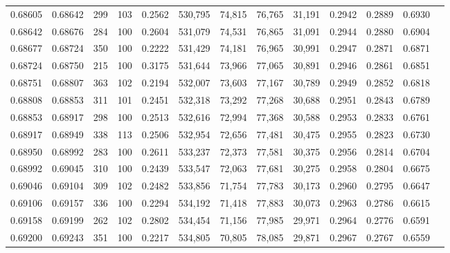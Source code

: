 \begin{tabular}{rrrrrrrrrrrrr}
0.68605 & 0.68642 &   299 & 103 &                                     0.2562 & 530,795 &  74,815 &  76,765 &  31,191 & 0.2942 & 0.2889 & 0.6930 \\
0.68642 & 0.68676 &   284 & 100 &                                     0.2604 & 531,079 &  74,531 &  76,865 &  31,091 & 0.2944 & 0.2880 & 0.6904 \\
0.68677 & 0.68724 &   350 & 100 &                                     0.2222 & 531,429 &  74,181 &  76,965 &  30,991 & 0.2947 & 0.2871 & 0.6871 \\
0.68724 & 0.68750 &   215 & 100 &                                     0.3175 & 531,644 &  73,966 &  77,065 &  30,891 & 0.2946 & 0.2861 & 0.6851 \\
0.68751 & 0.68807 &   363 & 102 &                                     0.2194 & 532,007 &  73,603 &  77,167 &  30,789 & 0.2949 & 0.2852 & 0.6818 \\
0.68808 & 0.68853 &   311 & 101 &                                     0.2451 & 532,318 &  73,292 &  77,268 &  30,688 & 0.2951 & 0.2843 & 0.6789 \\
0.68853 & 0.68917 &   298 & 100 &                                     0.2513 & 532,616 &  72,994 &  77,368 &  30,588 & 0.2953 & 0.2833 & 0.6761 \\
0.68917 & 0.68949 &   338 & 113 &                                     0.2506 & 532,954 &  72,656 &  77,481 &  30,475 & 0.2955 & 0.2823 & 0.6730 \\
0.68950 & 0.68992 &   283 & 100 &                                     0.2611 & 533,237 &  72,373 &  77,581 &  30,375 & 0.2956 & 0.2814 & 0.6704 \\
0.68992 & 0.69045 &   310 & 100 &                                     0.2439 & 533,547 &  72,063 &  77,681 &  30,275 & 0.2958 & 0.2804 & 0.6675 \\
0.69046 & 0.69104 &   309 & 102 &                                     0.2482 & 533,856 &  71,754 &  77,783 &  30,173 & 0.2960 & 0.2795 & 0.6647 \\
0.69106 & 0.69157 &   336 & 100 &                                     0.2294 & 534,192 &  71,418 &  77,883 &  30,073 & 0.2963 & 0.2786 & 0.6615 \\
0.69158 & 0.69199 &   262 & 102 &                                     0.2802 & 534,454 &  71,156 &  77,985 &  29,971 & 0.2964 & 0.2776 & 0.6591 \\
0.69200 & 0.69243 &   351 & 100 &                                     0.2217 & 534,805 &  70,805 &  78,085 &  29,871 & 0.2967 & 0.2767 & 0.6559 \\

\end{tabular}
